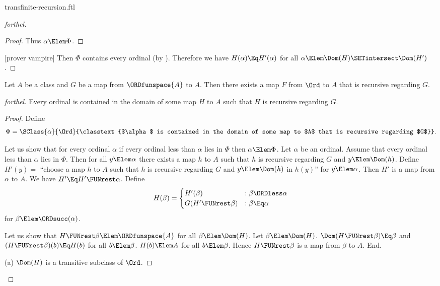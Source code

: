 \documentclass{stex}
\begin{document}
\begin{smodule}{transfinite-recursion.ftl}
\begin{proof}[forthel]
\begin{proof}
    Thus $\alpha \Elem \Phi$.
  \end{proof}

  [prover vampire]
  Then $\Phi$ contains every ordinal (by ).
  Therefore we have $H(\alpha) \Eq H'(\alpha)$ for all $\alpha \Elem \Dom(H) \SETintersect \Dom(H')$.
\end{proof}

\begin{theorem}[forthel,title=Transfinite Recursion: Existence]
  Let $A$ be a class and $G$ be a map from $\ORDfunspace{A}$ to $A$.
  Then there exists a map $F$ from $\Ord$ to $A$ that is recursive regarding $G$.
\end{theorem}
\begin{proof}[forthel]
  Every ordinal is contained in the domain of some map $H$ to $A$ such that $H$ is recursive regarding $G$.
  \begin{proof}
    Define \[ \Phi = \SClass{\alpha}{\Ord}{\classtext{$\alpha$ is contained in the domain of some map to $A$ that is recursive regarding $G$}}. \]

    Let us show that for every ordinal $\alpha$ if every ordinal less than $\alpha$ lies in $\Phi$ then $\alpha \Elem \Phi$.
      Let $\alpha$ be an ordinal.
      Assume that every ordinal less than $\alpha$ lies in $\Phi$.
      Then for all $y \Elem \alpha$ there exists a map $h$ to $A$ such that $h$ is recursive regarding $G$ and $y \Elem \Dom(h)$.
      Define $H'(y) =$ ``choose a map $h$ to $A$ such that $h$ is recursive regarding $G$ and $y \Elem \Dom(h)$ in $h(y)$'' for $y \Elem \alpha$.
      Then $H'$ is a map from $\alpha$ to $A$.
      We have $H' \Eq H' \FUNrest \alpha$.
      Define \[ H(\beta) =
        \begin{cases}
          H'(\beta)                 & : \beta \ORDless \alpha \\
          G(H' \FUNrest \beta)  & : \beta \Eq \alpha
        \end{cases} \]
      for $\beta \Elem \ORDsucc(\alpha)$.
      
      Let us show that $H \FUNrest \beta \Elem \ORDfunspace{A}$ for all $\beta \Elem \Dom(H)$.
        Let $\beta \Elem \Dom(H)$.
        $\Dom(H \FUNrest \beta) \Eq \beta$ and $(H \FUNrest \beta)(b) \Eq H(b)$ for all $b \Elem \beta$.
        $H(b) \Elem A$ for all $b \Elem \beta$.
        Hence $H \FUNrest \beta$ is a map from $\beta$ to $A$.
      End.

      (a) $\Dom(H)$ is a transitive subclass of $\Ord$.


\end{proof}
\end{proof}
\end{smodule}
\end{document}
